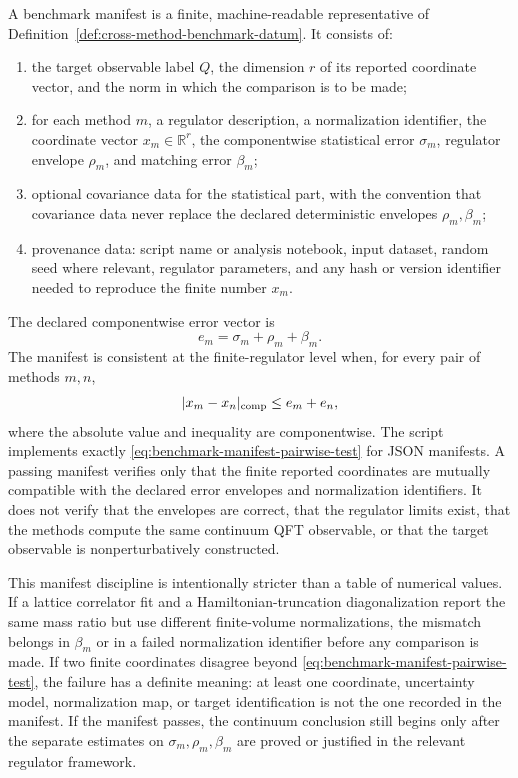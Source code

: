 \begin{definition}
\label{def:benchmark-manifest}
A benchmark manifest is a finite, machine-readable representative of
Definition~\ref{def:cross-method-benchmark-datum}.  It consists of:
\begin{enumerate}
  \item the target observable label \(Q\), the dimension \(r\) of its reported
  coordinate vector, and the norm in which the comparison is to be made;
  \item for each method \(m\), a regulator description, a normalization
  identifier, the coordinate vector \(x_m\in\mathbb R^r\), the componentwise
  statistical error \(\sigma_m\), regulator envelope \(\rho_m\), and
  matching error \(\beta_m\);
  \item optional covariance data for the statistical part, with the
  convention that covariance data never replace the declared deterministic
  envelopes \(\rho_m,\beta_m\);
  \item provenance data: script name or analysis notebook, input dataset,
  random seed where relevant, regulator parameters, and any hash or version
  identifier needed to reproduce the finite number \(x_m\).
\end{enumerate}
The declared componentwise error vector is
\begin{equation}
  e_m=\sigma_m+\rho_m+\beta_m.
  \label{eq:benchmark-manifest-total-error}
\end{equation}
The manifest is consistent at the finite-regulator level when, for every pair
of methods \(m,n\),
\begin{equation}
  |x_m-x_n|_{\rm comp}\leq e_m+e_n,
  \label{eq:benchmark-manifest-pairwise-test}
\end{equation}
where the absolute value and inequality are componentwise.  The script
 implements exactly
\eqref{eq:benchmark-manifest-pairwise-test} for JSON manifests.  A passing
manifest verifies only that the finite reported coordinates are mutually
compatible with the declared error envelopes and normalization identifiers.
It does not verify that the envelopes are correct, that the regulator limits
exist, that the methods compute the same continuum QFT observable, or that
the target observable is nonperturbatively constructed.
\end{definition}

This manifest discipline is intentionally stricter than a table of numerical
values.  If a lattice correlator fit and a Hamiltonian-truncation
diagonalization report the same mass ratio but use different finite-volume
normalizations, the mismatch belongs in \(\beta_m\) or in a failed
normalization identifier before any comparison is made.  If two finite
coordinates disagree beyond \eqref{eq:benchmark-manifest-pairwise-test}, the
failure has a definite meaning: at least one coordinate, uncertainty model,
normalization map, or target identification is not the one recorded in the
manifest.  If the manifest passes, the continuum conclusion still begins
only after the separate estimates on \(\sigma_m,\rho_m,\beta_m\) are proved
or justified in the relevant regulator framework.

